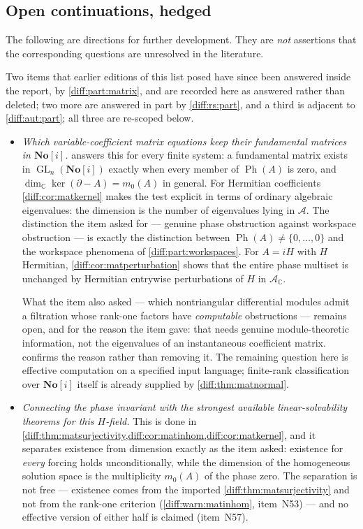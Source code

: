 \documentclass[11pt,letterpaper]{article}
\numberwithin{equation}{section}
\theoremstyle{definition}
\theoremstyle{remark}
\newcommand{\No}{\mathbf{No}}
\newcommand{\SC}{\mathbf{No}[i]}
\newcommand{\C}{\mathbb C}
\newcommand{\der}{\partial}
\newcommand{\Acl}{\mathcal A}
\newcommand{\GL}{\operatorname{GL}}
\newcommand{\Ker}{\operatorname{ker}}
\newcommand{\Ph}{\operatorname{Ph}}
\begin{document}
\subsection{Open continuations, hedged}
\label{diff:sub:nc:open}

The following are directions for further development. They are \emph{not}
assertions that the corresponding questions are unresolved in the literature.

Two items that earlier editions of this list posed have since been answered
inside the report, by \cref{diff:part:matrix}, and are recorded here as
answered rather than deleted; two more are answered in part by
\cref{diff:rs:part}, and a third is adjacent to \cref{diff:aut:part}; all three are
re-scoped below.
\begin{itemize}[leftmargin=1.6em]
\item \emph{Which variable-coefficient matrix equations keep their fundamental
matrices in $\No[i]$.}  answers this for every finite
system: a fundamental matrix exists in $\GL_{n}(\SC)$ exactly when every member
of $\Ph(A)$ is zero, and $\dim_{\C}\Ker(\der-A)=m_{0}(A)$ in general. For
Hermitian coefficients \cref{diff:cor:matkernel} makes the test explicit in
terms of ordinary algebraic eigenvalues: the dimension is the number of
eigenvalues lying in $\Acl$. The distinction the item asked for --- genuine
phase obstruction against workspace obstruction --- is exactly the distinction
between $\Ph(A)\neq\{0,\dots,0\}$ and the workspace phenomena of
\cref{diff:part:workspaces}. For $A=iH$ with $H$ Hermitian,
\cref{diff:cor:matperturbation} shows that the entire phase multiset is
unchanged by Hermitian entrywise perturbations of $H$ in $\Acl_{\C}$.

What the item also asked --- which nontriangular differential modules admit a
filtration whose rank-one factors have \emph{computable} obstructions ---
remains open, and for the reason the item gave: that needs genuine
module-theoretic information, not the eigenvalues of an instantaneous
coefficient matrix.  confirms the reason rather than
removing it. The remaining question here is effective computation on a
specified input language; finite-rank classification over $\SC$ itself is
already supplied by \cref{diff:thm:matnormal}.
\item \emph{Connecting the phase invariant with the strongest available
linear-solvability theorems for this $H$-field.} This is done in
\cref{diff:thm:matsurjectivity,diff:cor:matinhom,diff:cor:matkernel}, and it
separates existence from dimension exactly as the item asked: existence for
\emph{every} forcing holds unconditionally, while the dimension of the
homogeneous solution space is the multiplicity $m_{0}(A)$ of the phase zero.
The separation is not free --- existence comes from the imported
\cref{diff:thm:matsurjectivity} and not from the rank-one criterion
(\cref{diff:warn:matinhom}, item~N53) --- and no effective version of either
half is claimed (item~N57).
\end{itemize}
\end{document}
